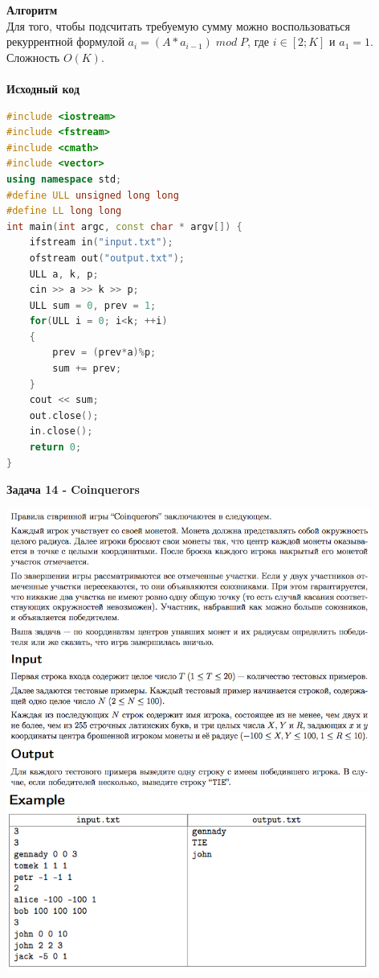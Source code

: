 \documentclass[a4paper,12pt]{article}
\begin{document}
\textbf{{\large Алгоритм}} \\
Для того, чтобы подсчитать требуемую сумму можно воспользоваться рекуррентной формулой $a_i = (A * a_{i-1}) \; mod \; P$, где $i \in [2; K]$ и $a_{1} = 1$. Сложность $O(K)$. \\ 
\\
\textbf{{\large Исходный код}}
\begin{lstlisting}[language=C++]
#include <iostream>
#include <fstream>
#include <cmath>
#include <vector>
using namespace std;
#define ULL unsigned long long
#define LL long long
int main(int argc, const char * argv[]) {
    ifstream in("input.txt");
    ofstream out("output.txt");
    ULL a, k, p;
    cin >> a >> k >> p;
    ULL sum = 0, prev = 1;
    for(ULL i = 0; i<k; ++i)
    {
        prev = (prev*a)%p;
        sum += prev;
    }
    cout << sum;
    out.close();
    in.close();
    return 0;
}
\end{lstlisting}
\newpage
\textbf{{\large Задача 14 - Coinquerors}} \\
\begin{center}
\includegraphics[width=0.9\textwidth]{OC_Siberia/OC_Siberia_14_1.png}\\ [1cm]
\includegraphics[width=0.9\textwidth]{OC_Siberia/OC_Siberia_14_2.png}\\ [1cm]

\end{center}
\newpage
\end{document}
